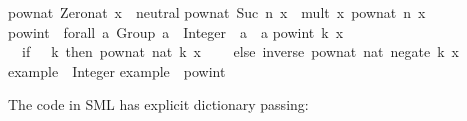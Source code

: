 \begin{isabellebody}
\begin{isamarkuptext}
pow{}nat\ Zero{}nat\ x\ {}\ neutral{}\isanewline
pow{}nat\ {}Suc\ n{}\ x\ {}\ mult\ x\ {}pow{}nat\ n\ x{}{}\isanewline
\isanewline
pow{}int\ {}{}\ forall\ a{}\ {}Group\ a{}\ {}{}\ Integer\ {}{}\ a\ {}{}\ a{}\isanewline
pow{}int\ k\ x\ {}\isanewline
\ \ {}if\ {}\ {}{}\ k\ then\ pow{}nat\ {}nat\ k{}\ x\isanewline
\ \ \ \ else\ inverse\ {}pow{}nat\ {}nat\ {}negate\ k{}{}\ x{}{}{}\isanewline
\isanewline
example\ {}{}\ Integer{}\isanewline
example\ {}\ pow{}int\ {}{}\ {}{}{}{}{}\isanewline
\isanewline
{}\isanewline%
\end{isamarkuptext}%
\isamarkuptrue%
%
\endisatagquotetypewriter
{\isafoldquotetypewriter}%
%
\isadelimquotetypewriter
%
\endisadelimquotetypewriter
%
\begin{isamarkuptext}%
\noindent The code in SML has explicit dictionary passing:%
\end{isamarkuptext}%

\end{isabellebody}
